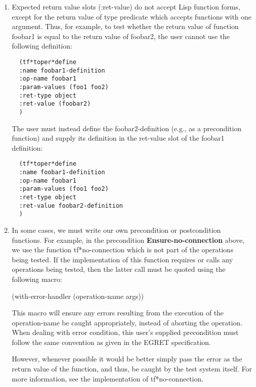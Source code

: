 \begin {enumerate}
\small\begin{verbatim}
    (tf*tpre*define
    :name foobar2-definition
    :op-name foobar2
    :param-values (foo3)
       :
    )
\end{verbatim}\normalsize

\item Expected return value slots (:ret-value) do not accept 
Lisp function forms, except for the return value of type predicate
which accepts functions with one argument.  Thus, for example, to
test whether the return value of function foobar1 is equal to the
return value of foobar2, the user cannot use the following definition:
\small\begin{verbatim}
  (tf*toper*define
  :name foobar1-definition
  :op-name foobar1
  :param-values (foo1 foo2)
  :ret-type object
  :ret-value (foobar2)
  )
\end{verbatim}\normalsize
The user must instead define the foobar2-definition (e.g., as a precondition
function) and supply
its definition in the ret-value slot of the foobar1 definition:
\small\begin{verbatim}
  (tf*toper*define
  :name foobar1-definition
  :op-name foobar1
  :param-values (foo1 foo2)
  :ret-type object
  :ret-value foobar2-definition
  )
\end{verbatim}\normalsize


\item In some cases,  we must write our own precondition or postcondition 
functions.
For example, in the precondition {\bf Ensure-no-connection} above, 
we use the function tf*no-connection which is not part of the operations
being tested. If the implementation of this function requires or calls
any operations being tested, then the latter call must be quoted
using the following macro:

(with-error-handler (operation-name args))\

This macro will ensure any errors resulting from the execution of the
operation-name be caught appropriately, instead of aborting
the operation.  
When dealing with error condition, this user's supplied precondition
must follow the same convention  as given in the EGRET specification.

However, whenever possible it would be better simply pass the error as 
the return value of the function, and thus,  be caught by the test system 
itself. For more  information, see the implementation of tf*no-connection.
\end{enumerate}

